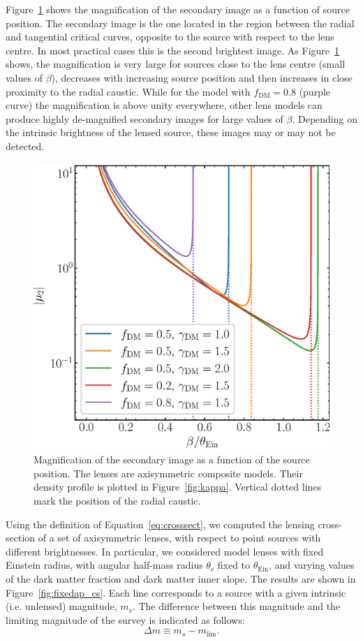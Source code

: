 \documentclass{aa}
\def\tein{\theta_{\mathrm{Ein}}}
\def\teff{\theta_{\mathrm{e}}}
\def\Fref#1{Figure~\ref{#1}\xspace}
\def\Eref#1{Equation~\ref{#1}\xspace}
\begin{document}
\Fref{fig:1dmag} shows the magnification of the secondary image as a function of source position. The secondary image is the one located in the region between the radial and tangential critical curves, opposite to the source with respect to the lens centre. In most practical cases this is the second brightest image.
As \Fref{fig:1dmag} shows, the magnification is very large for sources close to the lens centre (small values of $\beta$), decreases with increasing source position and then increases in close proximity to the radial caustic.
While for the model with $f_{\mathrm{DM}}=0.8$ (purple curve) the magnification is above unity everywhere, other lens models can produce highly de-magnified secondary images for large values of $\beta$.
Depending on the intrinsic brightness of the lensed source, these images may or may not be detected.

%
\begin{figure}
\includegraphics[width=\columnwidth]{composite_fixedap_mu2.eps}
\caption{
Magnification of the secondary image as a function of the source position.
The lenses are axisymmetric composite models. Their density profile is plotted in \Fref{fig:kappa}.
Vertical dotted lines mark the position of the radial caustic.
\label{fig:1dmag}
}
\end{figure}

Using the definition of \Eref{eq:crosssect}, we computed the lensing cross-section of a set of axisymmetric lenses, with respect to point sources with different brightnesses.
In particular, we considered model lenses with fixed Einstein radius, with angular half-mass radius $\teff$ fixed to $\tein$, and varying values of the dark matter fraction and dark matter inner slope.
The results are shown in \Fref{fig:fixedap_cs}.
Each line corresponds to a source with a given intrinsic (i.e. unlensed) magnitude, $m_s$. The difference between this magnitude and the limiting magnitude of the survey is indicated as follows:
\begin{equation}
\Delta m \equiv m_s - m_{\mathrm{lim}}.
\end{equation}
\end{document}
